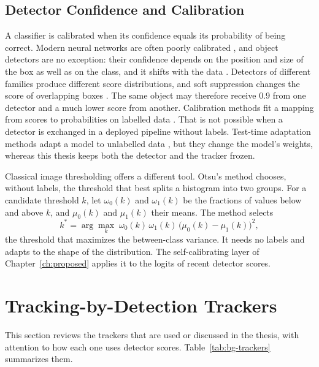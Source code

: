 \subsection{Detector Confidence and Calibration}\label{sec:bg-confidence}
A classifier is calibrated when its confidence equals its probability of being correct. Modern neural networks are often poorly calibrated \cite{guo2017calibration}, and object detectors are no exception: their confidence depends on the position and size of the box as well as on the class, and it shifts with the data \cite{kuppers2020detcalib}. Detectors of different families \cite{redmon2016yolo,ren2017fasterrcnn,carion2020detr,zhao2024rtdetr,wang2024yolov9} produce different score distributions, and soft suppression changes the score of overlapping boxes \cite{bodla2017softnms}. The same object may therefore receive 0.9 from one detector and a much lower score from another. Calibration methods fit a mapping from scores to probabilities on labelled data \cite{kuppers2020detcalib}. That is not possible when a detector is exchanged in a deployed pipeline without labels. Test-time adaptation methods adapt a model to unlabelled data \cite{wang2021tent}, but they change the model's weights, whereas this thesis keeps both the detector and the tracker frozen.

Classical image thresholding offers a different tool. Otsu's method \cite{otsu1979} chooses, without labels, the threshold that best splits a histogram into two groups. For a candidate threshold $k$, let $\omega_0(k)$ and $\omega_1(k)$ be the fractions of values below and above $k$, and $\mu_0(k)$ and $\mu_1(k)$ their means. The method selects
\begin{equation}
k^{*}=\arg\max_{k}\;\omega_0(k)\,\omega_1(k)\,\bigl(\mu_0(k)-\mu_1(k)\bigr)^2,
\label{eq:bg-otsu}
\end{equation}
the threshold that maximizes the between-class variance. It needs no labels and adapts to the shape of the distribution. The self-calibrating layer of Chapter~\ref{ch:proposed} applies it to the logits of recent detector scores.

\section{Tracking-by-Detection Trackers}\label{sec:bg-trackers}
This section reviews the trackers that are used or discussed in the thesis, with attention to how each one uses detector scores. Table~\ref{tab:bg-trackers} summarizes them.

